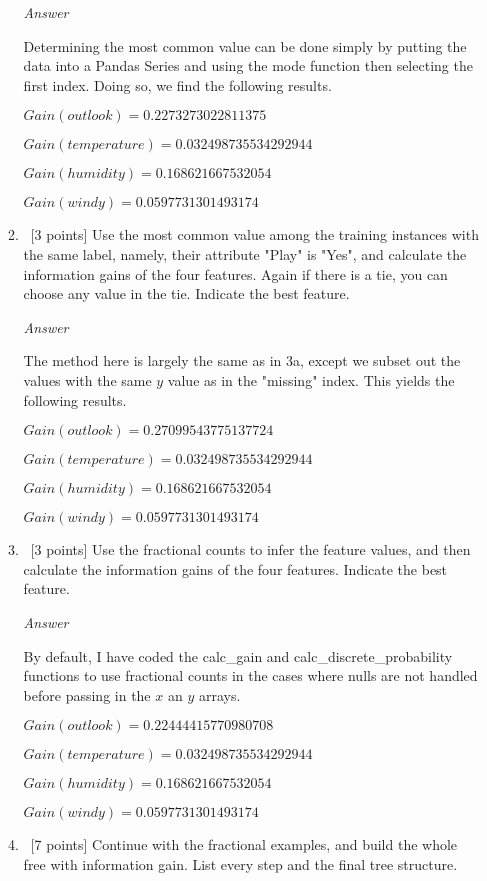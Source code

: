 \documentclass[12pt, fullpage,letterpaper]{article}
\begin{document}
\begin{enumerate}
\begin{enumerate}
\emph{Answer}

Determining the most common value can be done simply by putting the data into a Pandas Series and using the mode function then selecting the first index. Doing so, we find the following results.

$Gain(outlook)=0.2273273022811375$

$Gain(temperature)=0.032498735534292944$

$Gain(humidity)=0.168621667532054$

$Gain(windy)=0.0597731301493174$

\item~[3 points] Use the most common value among the  training instances with the same label, namely, their attribute "Play" is "Yes", and calculate the information gains of the four features. Again if there is a tie, you can choose any value in the tie. Indicate the best feature.

\emph{Answer}

The method here is largely the same as in 3a, except we subset out the values with the same $y$ value as in the "missing" index. This yields the following results.

$Gain(outlook)=0.27099543775137724$

$Gain(temperature)=0.032498735534292944$

$Gain(humidity)=0.168621667532054$

$Gain(windy)=0.0597731301493174$

\item~[3 points] Use the fractional counts to infer the feature values, and then calculate the information gains of the four features. Indicate the best feature.

\emph{Answer}

By default, I have coded the calc\_gain and calc\_discrete\_probability functions to use fractional counts in the cases where nulls are not handled before passing in the $x$ an $y$ arrays.

$Gain(outlook)=0.22444415770980708$

$Gain(temperature)=0.032498735534292944$

$Gain(humidity)=0.168621667532054$

$Gain(windy)=0.0597731301493174$

\item~[7 points] Continue with the fractional examples, and build the whole free with information gain. List every step and the final tree structure.  


\end{enumerate}
\end{enumerate}
\end{document}
